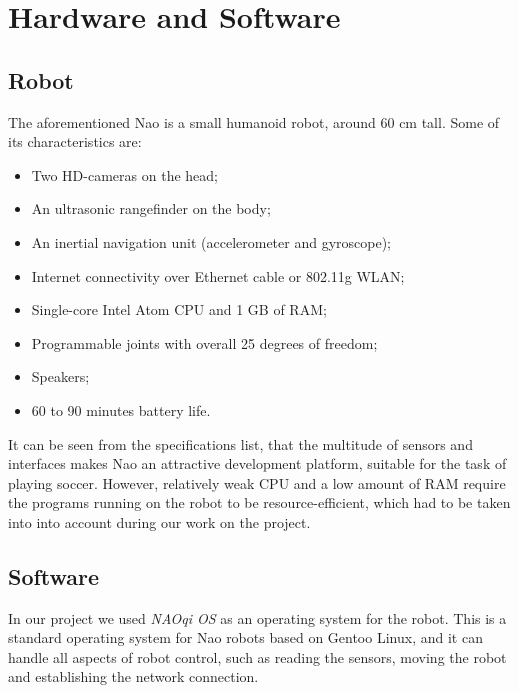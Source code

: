 \chapter{Hardware and Software}

\section{Robot}

The aforementioned Nao \cite{nao} is a small humanoid robot, around 60
cm tall. Some of its characteristics are:

\begin{itemize}

\item Two HD-cameras on the head;

\item An ultrasonic rangefinder on the body;

\item An inertial navigation unit (accelerometer and gyroscope);

\item Internet connectivity over Ethernet cable or 802.11g WLAN;

\item Single-core Intel Atom CPU and 1 GB of RAM;

\item Programmable joints with overall 25 degrees of freedom;

\item Speakers;

\item 60 to 90 minutes battery life.

\end{itemize}

It can be seen from the specifications list, that the multitude of sensors and
interfaces makes Nao an attractive development platform, suitable for the task
of playing soccer. However, relatively weak CPU and a low amount of RAM require
the programs running on the robot to be resource-efficient, which had to be
taken into into account during our work on the project.

\section{Software}

In our project we used \textit{NAOqi OS} as an operating system for the robot.
This is a standard operating system for Nao robots based on Gentoo Linux, and
it can handle all aspects of robot control, such as reading the sensors, moving
the robot and establishing the network connection.

